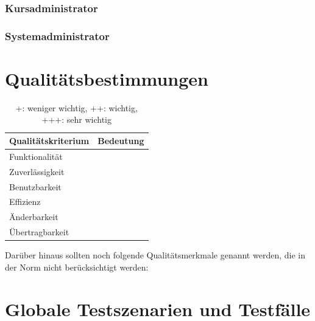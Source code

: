 \documentclass[a4paper]{scrreprt}
\begin{document}
            
            
        \subsection{Kursadministrator}
            
             
            
        \subsection{Systemadministrator}
           
            
            
            
         
\chapter{Qualitätsbestimmungen}

\begin{table}[h]
 
    \begin{center}
    \begin{tabular}{|l|c|}
    \hline 
    \rule[-1ex]{0pt}{2.5ex} \textbf{Qualitätskriterium} & \textbf{Bedeutung} \\ 
    \hline 
    \rule[-1ex]{0pt}{2.5ex} Funktionalität &  \\ 
    \hline 
    \rule[-1ex]{0pt}{2.5ex} Zuverlässigkeit &  \\ 
    \hline 
    \rule[-1ex]{0pt}{2.5ex} Benutzbarkeit &  \\ 
    \hline 
    \rule[-1ex]{0pt}{2.5ex} Effizienz &  \\ 
    \hline 
    \rule[-1ex]{0pt}{2.5ex} Änderbarkeit &  \\ 
    \hline 
    \rule[-1ex]{0pt}{2.5ex} Übertragbarkeit &  \\ 
    \hline   
    \end{tabular}  
    \end{center}
    \caption{+: weniger wichtig, ++: wichtig, +++: sehr wichtig} 
    \label{qTabelle}   
\end{table}
    
Darüber hinaus sollten noch folgende Qualitätsmerkmale genannt werden, die in der Norm nicht berücksichtigt werden:
 
\chapter{Globale Testszenarien und Testfälle}
 
\end{document}
